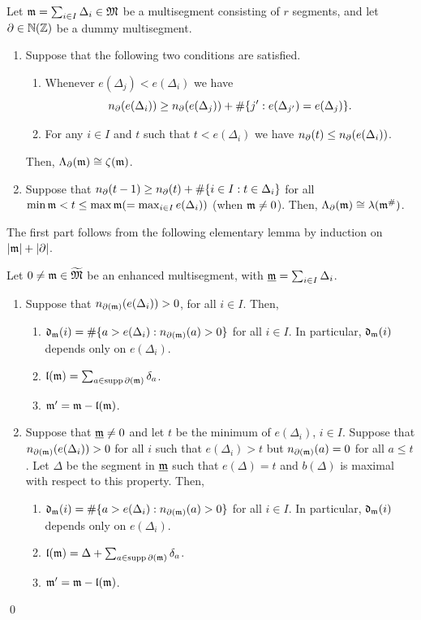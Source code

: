 \documentclass{ert-l} %
\begin{document}
\begin{proposition}\label{prop: std}
Let $\mathfrak{m}=\sum_{i\in I}\Delta_i\in \mathfrak{M}$ be a multisegment consisting of $r$ segments, and let $\partial\in \mathbb{N}(\mathbb{Z})$ be a dummy multisegment.
\begin{enumerate}
\item\label{it: std1} Suppose that the following two conditions are satisfied.
\begin{enumerate}
\item Whenever $e(\Delta_j)<e(\Delta_i)$ we have
\[
n_\partial(e(\Delta_i))\ge n_\partial(e(\Delta_j))+\#\{j':e(\Delta_{j'})=e(\Delta_j)\}.
\]
\item For any $i\in I$ and $t$ such that $t<e(\Delta_i)$ we have $n_\partial(t)\le n_\partial(e(\Delta_i))$.
\end{enumerate}
Then, $\Lambda_{\partial}(\mathfrak{m})\cong\zeta(\mathfrak{m})$.

\item \label{it: std2}
Suppose that $n_\partial(t-1)\ge n_\partial(t)+\#\{i\in I:t\in\Delta_i\}$ for all $\min\mathfrak{m}<t\le\max\mathfrak{m}(=\max_{i\in I}e(\Delta_i))$ (when $\mathfrak{m}\ne0$).
Then, $\Lambda_{\partial}(\mathfrak{m})\cong\lambda(\mathfrak{m}^\#)$.
\end{enumerate}
\end{proposition}

The first part follows from the following elementary lemma by induction on $|\mathfrak{m}|+|\partial|$.

\begin{lemma} \label{lem: 1stcase}
Let $0\ne\mathfrak{m} \in \widetilde{\mathfrak{M}}$ be an enhanced multisegment, with $\underline{\mathfrak{m}}=\sum_{i\in I}\Delta_i$.

\begin{enumerate}
\item Suppose that $n_{\partial(\mathfrak{m})}(e(\Delta_i))>0$, for all $i\in I$. Then,
\begin{enumerate}
\item $\mathfrak{d}_{\mathfrak{m}}(i)=\#\{a>e(\Delta_i):n_{\partial(\mathfrak{m})}(a)>0\}$ for all $i\in I$.
In particular, $\mathfrak{d}_{\mathfrak{m}}(i)$ depends only on $e(\Delta_i)$.
\item $\mathfrak{l}(\mathfrak{m}) = \sum_{a\in\operatorname{supp}\partial(\mathfrak{m})}\delta_a$.
\item $\mathfrak{m}'=\mathfrak{m}-\mathfrak{l}(\mathfrak{m})$.
\end{enumerate}

\item Suppose that $\underline{\mathfrak{m}}\ne0$ and let $t$ be the minimum of $e(\Delta_i)$, $i\in I$.
Suppose that $n_{\partial(\mathfrak{m})}(e(\Delta_i))>0$ for all $i$ such that $e(\Delta_i)>t$ but $n_{\partial(\mathfrak{m})}(a)=0$ for all $a\le t$.
Let $\Delta$ be the segment in $\underline{\mathfrak{m}}$ such that $e(\Delta)=t$ and $b(\Delta)$ is maximal with respect to this property.
Then,
\begin{enumerate}
\item $\mathfrak{d}_{\mathfrak{m}}(i)=\#\{a>e(\Delta_i):n_{\partial(\mathfrak{m})}(a)>0\}$ for all $i\in I$.
In particular, $\mathfrak{d}_{\mathfrak{m}}(i)$ depends only on $e(\Delta_i)$.
\item $\mathfrak{l}(\mathfrak{m}) = \Delta+\sum_{a\in\operatorname{supp}\partial(\mathfrak{m})}\delta_a$.
\item $\mathfrak{m}'=\mathfrak{m}-\mathfrak{l}(\mathfrak{m})$.
\end{enumerate}
\end{enumerate}
\qed
\end{lemma}
\end{document}
